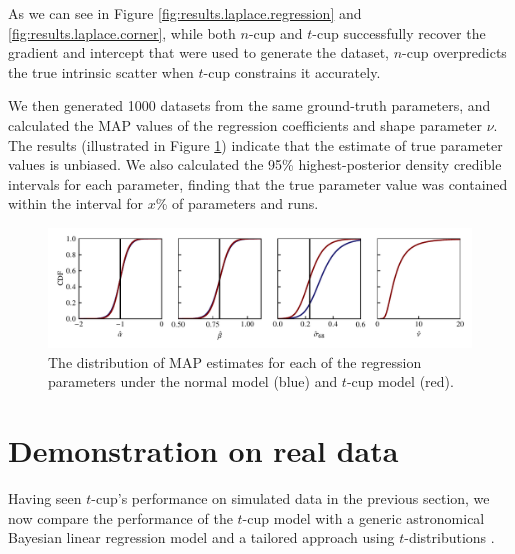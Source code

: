 \documentclass[fleqn,usenatbib]{rasti}
\begin{document}
As we can see in Figure \ref{fig:results.laplace.regression} and
\ref{fig:results.laplace.corner}, while both $n$-cup and $t$-cup successfully
recover the gradient and intercept that were used to generate the dataset,
$n$-cup overpredicts the true intrinsic scatter when $t$-cup constrains it
accurately.

We then generated 1000 datasets from the same ground-truth parameters, and
calculated the MAP values of the regression coefficients
and shape parameter $\nu$. The results (illustrated in Figure
\ref{fig:results.laplace.map}) indicate that the estimate of true parameter
values is unbiased.{ \color{red} We also calculated the 95\% highest-posterior
density credible intervals for each parameter, finding that the true parameter
value was contained within the interval for $x$\% of parameters and runs.  }

\begin{figure}
    \includegraphics[width=\columnwidth]{graphics/fixed/laplace_cdf.pdf}
    \caption{The distribution of MAP estimates for each
    of the regression parameters under the normal model (blue) and $t$-cup model
    (red).}
    \label{fig:results.laplace.map}
\end{figure}


\section{Demonstration on real data}
\label{sec:real-world}

Having seen $t$-cup's performance on simulated data in the previous section, we
now compare the performance of the $t$-cup model with a generic astronomical
Bayesian linear regression model \citep[\textsc{linmix\_err};][]{Kelly:2007} and
a tailored approach using $t$-distributions \citep{Park:2017}.
\end{document}
